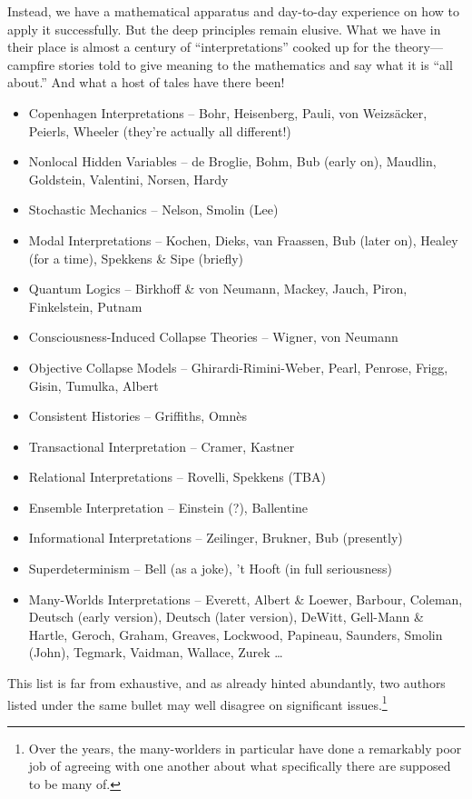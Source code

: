 \documentclass[aps,pra,superscriptaddress,10pt,tightenlines,twocolumn,nofootinbib]{revtex4}
\begin{document}
Instead, we have a mathematical apparatus and day-to-day experience on how to apply it successfully.  But the deep principles remain elusive.  What we have in their place is almost a century of ``interpretations'' cooked up for the theory---campfire stories told to give meaning to the mathematics and say what it is ``all about.''  And what a host of tales have there been!
\begin{flushleft}
\begin{itemize}
\item Copenhagen Interpretations -- Bohr, Heisenberg, Pauli, von Weizs\"acker, Peierls, Wheeler (they're actually all different!)
\item Nonlocal Hidden Variables -- de Broglie, Bohm, Bub (early on), Maudlin, Goldstein, Valentini, Norsen, Hardy
\item Stochastic Mechanics -- Nelson, Smolin (Lee)
\item Modal Interpretations -- Kochen, Dieks, van Fraassen, Bub (later on), Healey (for a time),
  Spekkens \& Sipe (briefly)
\item Quantum Logics -- Birkhoff \& von Neumann, Mackey, Jauch, Piron, Finkelstein, Putnam
\item Consciousness-Induced Collapse Theories -- Wigner, von Neumann
\item Objective Collapse Models -- Ghirardi-Rimini-Weber, Pearl, Penrose, Frigg, Gisin, Tumulka, Albert
\item Consistent Histories -- Griffiths, Omn\`es
\item Transactional Interpretation -- Cramer, Kastner
\item Relational Interpretations -- Rovelli, Spekkens (TBA)
\item Ensemble Interpretation -- Einstein (?), Ballentine
\item Informational Interpretations -- Zeilinger, Brukner, Bub (presently)
\item Superdeterminism -- Bell (as a joke), 't Hooft (in full seriousness)
\item Many-Worlds Interpretations -- Everett, Albert \& Loewer, Barbour,
  Coleman, Deutsch (early version), Deutsch (later version), DeWitt, Gell-Mann \& Hartle, Geroch,
  Graham, Greaves, Lockwood, Papineau, Saunders,
  Smolin (John), Tegmark, Vaidman, Wallace, Zurek \ldots
\end{itemize}
\end{flushleft}
This list is far from exhaustive, and as already hinted abundantly, two authors listed under the same bullet may well disagree on significant issues.\footnote{Over the years, the many-worlders in particular have done a remarkably poor job of agreeing with one another about what specifically there are supposed to be many of.}
\end{document}

